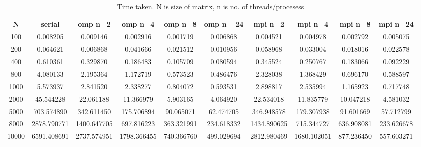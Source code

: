 \documentclass{article}
\begin{document}
\begin{table}[h]
	\caption{Time taken. N is size of matrix, n is no. of threads/procesess}
	\centering
	\begin{tabular}{| S[round-precision=3] | S[round-precision=3] | S[round-precision=3] | S[round-precision=3] | S[round-precision=3] | S[round-precision=3] | S[round-precision=3] | S[round-precision=3] | S[round-precision=3] | S[round-precision=3] |}
			\hline
			{N}&{serial} & {omp n=2}& {omp n=4}& {omp n=8}& {omp n= 24} & {mpi n=2}& {mpi n=4}& {mpi n=8}& {mpi n=24} \\ \hline
			{100}&0.008205&0.009146&0.002916&0.001719
			&0.006868 & 0.004521 & 0.004978 &0.002792&0.005075\\ \hline

			{200}&0.064621&0.006868&0.041666&	0.021512&0.010956
			&0.058968&0.033004&0.018016&0.022578\\ \hline

			{400} &0.610361&0.329870&0.186483&0.105709&0.080594 
			&0.345524&0.250767&0.183066&0.092229\\ \hline

			{800}&4.080133&2.195364&1.172719&0.573523&0.486476
			&2.328038&1.368429&0.696170&0.588597\\ \hline

			{1000}&5.573937&2.841520&2.338277&0.804072&0.593531
			&2.898817&2.535994&1.165923&0.717748\\ \hline

			{2000}&45.544228&22.061188&11.366979&5.903165&4.064920
			&22.534018&11.835779&10.047218&4.581032\\ \hline

			{5000}&703.574890&342.611450&175.706894&90.065071&62.474705
			&346.948578&179.307938&91.601669&57.712799\\ \hline

			{8000}&2878.790771&1400.647705&697.816223&363.321991 
			&234.618332&1434.890625&715.344727&636.908081
			&233.626678 \\ \hline

			{10000}&6591.408691&2737.574951&1798.366455&740.366760 
			&499.029694&2812.980469&1680.102051&877.236450&557.603271\\ 
			\hline
		\end{tabular}


\end{table}
\end{document}
